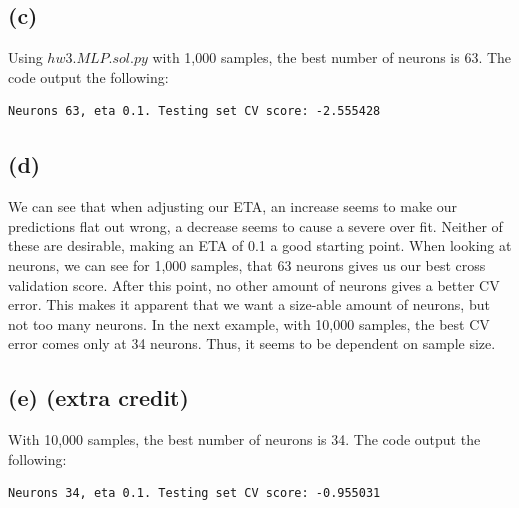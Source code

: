 \documentclass[a4paper]{article}
\begin{document}
\subsection{(c)}
Using $hw3.MLP.sol.py$ with 1,000 samples, the best number of neurons is 63. The code output the following:
\begin{lstlisting}[frame=single]
Neurons 63, eta 0.1. Testing set CV score: -2.555428
\end{lstlisting}
\subsection{(d)}
We can see that when adjusting our ETA, an increase seems to make our predictions flat out wrong, a decrease seems to cause a severe over fit. Neither of these are desirable, making an ETA of 0.1 a good starting point. When looking at neurons, we can see for 1,000 samples, that 63 neurons gives us our best cross validation score. After this point, no other amount of neurons gives a better CV error. This makes it apparent that we want a size-able amount of neurons, but not too many neurons. In the next example, with 10,000 samples, the best CV error comes only at 34 neurons. Thus, it seems to be dependent on sample size.
\subsection{(e) (extra credit)}
With 10,000 samples, the best number of neurons is 34. The code output the following:
\begin{lstlisting}[frame=single]
Neurons 34, eta 0.1. Testing set CV score: -0.955031
\end{lstlisting}
\end{document}
